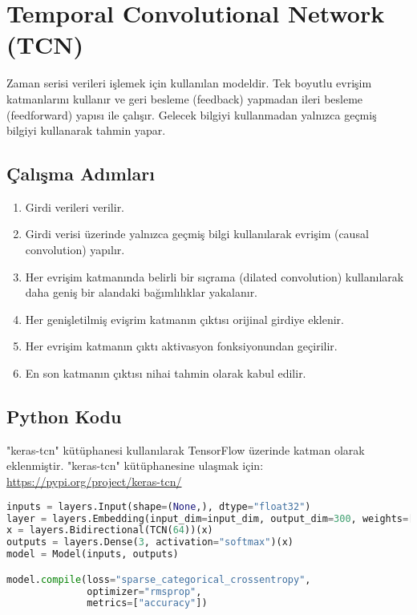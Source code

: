 \section{Temporal Convolutional Network (TCN)}
Zaman serisi verileri işlemek için kullanılan modeldir. Tek boyutlu evrişim katmanlarını kullanır ve geri besleme (feedback) yapmadan ileri besleme (feedforward) yapısı ile çalışır. Gelecek bilgiyi kullanmadan yalnızca geçmiş bilgiyi kullanarak tahmin yapar.

\subsection{Çalışma Adımları}
\begin{enumerate}
	\item Girdi verileri verilir.
	\item Girdi verisi üzerinde yalnızca geçmiş bilgi kullanılarak evrişim (causal convolution) yapılır.
	\item Her evrişim katmanında belirli bir sıçrama (dilated convolution) kullanılarak daha geniş bir alandaki bağımlılıklar yakalanır.
	\item Her genişletilmiş evişrim katmanın çıktısı orijinal girdiye eklenir.
	\item Her evrişim katmanın çıktı aktivasyon fonksiyonundan geçirilir.
	\item En son katmanın çıktısı nihai tahmin olarak kabul edilir.
\end{enumerate}

\subsection{Python Kodu}

"keras-tcn" kütüphanesi kullanılarak TensorFlow üzerinde katman olarak eklenmiştir. "keras-tcn" kütüphanesine ulaşmak için: \url{https://pypi.org/project/keras-tcn/}

\begin{lstlisting}[language=Python]
inputs = layers.Input(shape=(None,), dtype="float32")
layer = layers.Embedding(input_dim=input_dim, output_dim=300, weights=[embedding_matrix], input_length=maxlen, trainable=False)(inputs)
x = layers.Bidirectional(TCN(64))(x)
outputs = layers.Dense(3, activation="softmax")(x)
model = Model(inputs, outputs)

model.compile(loss="sparse_categorical_crossentropy",
              optimizer="rmsprop",
              metrics=["accuracy"])
\end{lstlisting}

\newpage
